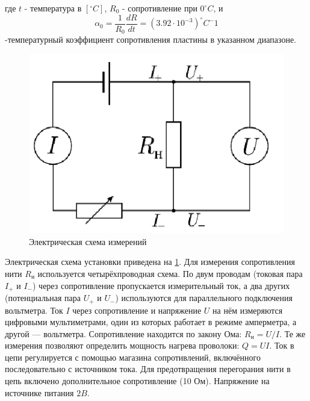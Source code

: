 \documentclass[12pt]{article}
\begin{document}
        где $t$ - температура в $[^{\circ} C]$, $R_0$ - сопротивление при $0 ^{\circ} C$, и
        \[
            \alpha_0 = \frac{1}{R_0}\frac{dR}{dt} = (3.92\cdot 10^{-3}) ^{\circ} C^-1
        \]
        -температурный коэффициент сопротивления пластины в указанном диапазоне.
        \begin{figure}[H]
            \centering
            \includegraphics[width=0.4\linewidth]{electricity.png}
            \caption{Электрическая схема измерений}
            \label{electricity}
        \end{figure}
        Электрическая схема установки приведена на \ref{electricity}. Для измерения сопротивления нити $R_{\text{н}}$
        используется четырёхпроводная схема. По двум проводам (токовая пара $I_{+}$ и $I_{-}$) через сопротивление
        пропускается измерительный ток, а два других (потенциальная пара $U_{+}$ и $U_{-}$) используются
        для параллельного подключения вольтметра. Ток $I$ через сопротивление и напряжение $U$ на нём
        измеряются цифровыми мультиметрами, один из которых работает в режиме амперметра, а другой — вольтметра.
        Сопротивление находится по закону Ома: $R_{\text{н}} = U/I$. Те же измерения позволяют определить мощность
        нагрева проволоки: $Q = UI$. Ток в цепи регулируется с помощью магазина сопротивлений, включённого
        последовательно с источником тока. Для предотвращения перегорания нити в цепь включено дополнительное
        сопротивление (10 Ом). Напряжение на источнике питания $2 B$.
\end{document}

